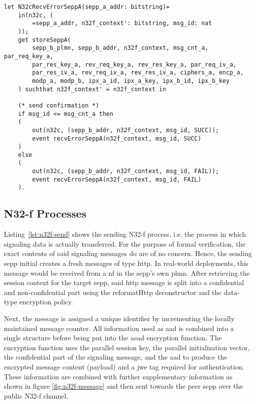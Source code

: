 \begin{lstlisting}[caption={Definition of the receiving error signaling process},label={lst:n32c-error-recv},firstnumber=427]
let N32cRecvErrorSeppA(sepp_a_addr: bitstring)=
    in(n32c, (
        =sepp_a_addr, n32f_context': bitstring, msg_id: nat
    ));
    get storeSeppA(
        sepp_b_plmn, sepp_b_addr, n32f_context, msg_cnt_a, par_req_key_a,
        par_res_key_a, rev_req_key_a, rev_res_key_a, par_req_iv_a,
        par_res_iv_a, rev_req_iv_a, rev_res_iv_a, ciphers_a, encp_a,
        modp_a, modp_b, ipx_a_id, ipx_a_key, ipx_b_id, ipx_b_key
    ) suchthat n32f_context' = n32f_context in

    (* send confirmation *)
    if msg_id <= msg_cnt_a then
    (
        out(n32c, (sepp_b_addr, n32f_context, msg_id, SUCC));
        event recvErrorSeppA(n32f_context, msg_id, SUCC)
    )
    else
    (
        out(n32c, (sepp_b_addr, n32f_context, msg_id, FAIL));
        event recvErrorSeppA(n32f_context, msg_id, FAIL)
    ).
\end{lstlisting}

\subsection{N32-f Processes}

Listing~\ref{lst:n32f-send} shows the sending N32-f process, i.e. the process in which signaling data is actually transferred.
For the purpose of formal verification, the exact contents of said signaling messages do are of no concern.
Hence, the sending \gls{sepp} initial creates a fresh messages of type {\sffamily http}.
In real-world deployments, this message would be received from a \gls{nf} in the \gls{sepp}'s own \gls{plmn}.
After retrieving the session context for the target \gls{sepp}, said \gls{http} message is split into a confidential and non-confidential part using the {\sffamily reformatHttp} deconstructor and the data-type encryption policy.

Next, the message is assigned a unique identifier by incrementing the locally maintained message counter.
All information used as \gls{aad} is combined into a single structure before being put into the \gls{aead} encryption function.
The encryption function uses the parallel session key, the parallel initialization vector, the confidential part of the signaling message, and the \gls{aad} to produce the encrypted message content ({\sffamily payload}) and a \gls{jwe} tag required for authentication.
These information are combined with further supplementary information as shown in figure \ref{fig:n32f-message} and then sent towards the peer \gls{sepp} over the public N32-f channel.

